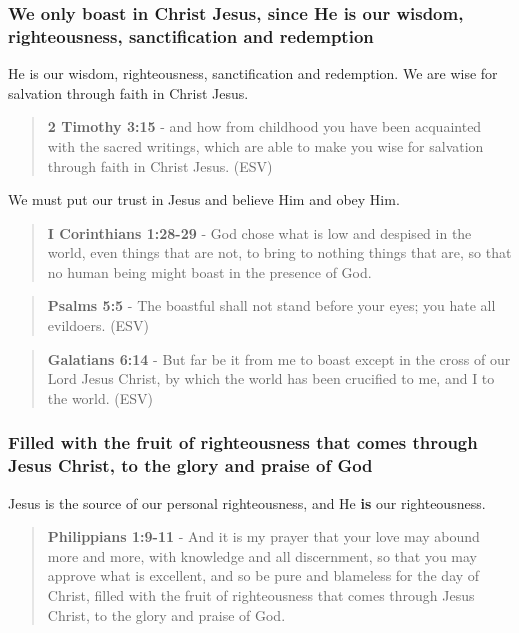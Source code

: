 \documentclass[11pt]{article}
\begin{document}
\subsubsection{We only boast in Christ Jesus, since He is our wisdom, righteousness, sanctification and redemption}
\label{sec:org88bf333}
He is our wisdom, righteousness, sanctification and redemption.
We are wise for salvation through faith in Christ Jesus.

\begin{quote}
\textbf{2 Timothy 3:15} -  and how from childhood you have been acquainted with the sacred writings, which are able to make you wise for salvation through faith in Christ Jesus.  (ESV)
\end{quote}

We must put our trust in Jesus and believe Him and obey Him.

\begin{quote}
\textbf{I Corinthians 1:28-29} - God chose what is low and despised in the world, even things that are not, to bring to nothing things that are, so that no human being might boast in the presence of God.
\end{quote}

\begin{quote}
\textbf{Psalms 5:5} -  The boastful shall not stand before your eyes; you hate all evildoers.  (ESV)
\end{quote}

\begin{quote}
\textbf{Galatians 6:14} -  But far be it from me to boast except in the cross of our Lord Jesus Christ, by which the world has been crucified to me, and I to the world.  (ESV)
\end{quote}

\subsubsection{Filled with the fruit of righteousness that comes through Jesus Christ, to the glory and praise of God}
\label{sec:orgfe096f0}
Jesus is the source of our personal righteousness, and He \textbf{is} our righteousness.

\begin{quote}
\textbf{Philippians 1:9-11} - And it is my prayer that your love may abound more and more, with knowledge and all discernment, so that you may approve what is excellent, and so be pure and blameless for the day of Christ, filled with the fruit of righteousness that comes through Jesus Christ, to the glory and praise of God.
\end{quote}
\end{document}
